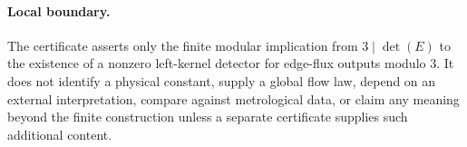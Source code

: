 \paragraph{Local boundary.}
The certificate asserts only the finite modular implication from $3\mid \det(E)$ to the existence of a nonzero left-kernel detector for edge-flux outputs modulo $3$. It does not identify a physical constant, supply a global flow law, depend on an external interpretation, compare against metrological data, or claim any meaning beyond the finite construction unless a separate certificate supplies such additional content.